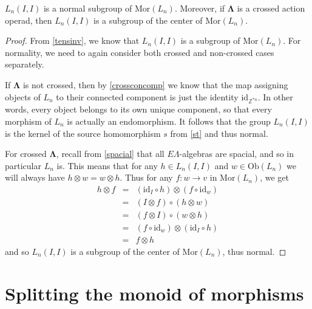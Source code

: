 \documentclass{amsbook} %
\newcommand{\ML}{\mathbf{\Lambda}}
\newcommand{\MorLn}{\mathrm{Mor}(L_n)}
\numberwithin{section}{chapter}
\begin{document}
\begin{prop} \label{endnorm} $L_n(I,I)$ is a normal subgroup of $\MorLn$. Moreover, if $\ML$ is a crossed action operad, then $L_n(I,I)$ is a subgroup of the center of $\MorLn$.
\end{prop}
\begin{proof}
From \cref{tensinv}, we know that $L_n(I,I)$ is a subgroup of $\MorLn$. For normality, we need to again consider both crossed and non-crossed cases separately. 

If $\ML$ is not crossed, then by \cref{crossconcomp} we know that the map assigning objects of $L_n$ to their connected component is just the identity $\mathrm{id}_{\mathbb{Z}^{\ast n}}$. In other words, every object belongs to its own unique component, so that every morphism of $L_n$ is actually an endomorphism. It follows that the group $L_n(I,I)$ is the kernel of the source homomorphism $s$ from \cref{st} and thus normal.

For crossed $\ML$, recall from \cref{spacial} that all $E\Lambda$-algebras are spacial, and so in particular $L_n$ is. This means that for any $h \in L_n(I,I)$ and $w \in \mathrm{Ob}(L_n)$ we will always have $h \otimes w = w \otimes h$. Thus for any $f:w \to v$ in $\MorLn$, we get
\[ \begin{array}{rll}
		h \otimes f & = & (\mathrm{id}_I \circ h) \otimes (f \circ \mathrm{id}_w) \\
		& = & (I \otimes f) \circ (h \otimes w) \\
		& = & (f \otimes I) \circ (w \otimes h) \\
		& = & (f \circ \mathrm{id}_w) \otimes (\mathrm{id}_I \circ h) \\
		& = & f \otimes h
		\end{array}
\]
and so $L_n(I,I)$ is a subgroup of the center of $\MorLn$, thus normal. 
\end{proof}

\section{Splitting the monoid of morphisms}
\end{document}
